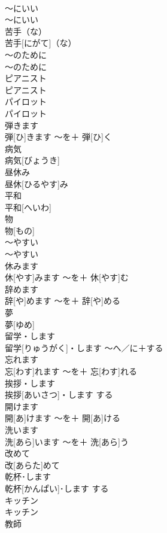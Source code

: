 \documentclass[8pt]{extreport}
\begin{document}
\begin{CJK}{UTF8}{min}
\\	〜にいい	
\\	〜にいい		
\\	苦手（な）	
\\	苦手[にがて]（な）		
\\	〜のために	
\\	〜のために		
\\	ピアニスト	
\\	ピアニスト		
\\	パイロット	
\\	パイロット		
\\	弾きます	
\\	弾[ひ]きます	〜を＋ 弾[ひ]く	
\\	病気	
\\	病気[びょうき]		
\\	昼休み	
\\	昼休[ひるやす]み		
\\	平和	
\\	平和[へいわ]		
\\	物	
\\	物[もの]		
\\	〜やすい	
\\	〜やすい		
\\	休みます	
\\	休[やす]みます	〜を＋ 休[やす]む	
\\	辞めます	
\\	辞[や]めます	〜を＋ 辞[や]める	
\\	夢	
\\	夢[ゆめ]		
\\	留学・します	
\\	留学[りゅうがく]・します	〜へ／に＋する	
\\	忘れます	
\\	忘[わす]れます	〜を＋ 忘[わす]れる	
\\	挨拶・します	
\\	挨拶[あいさつ]・します	する	
\\	開けます	
\\	開[あ]けます	〜を＋ 開[あ]ける	
\\	洗います	
\\	洗[あら]います	〜を＋ 洗[あら]う	
\\	改めて	
\\	改[あらた]めて		
\\	乾杯･します	
\\	乾杯[かんぱい]･します	する	
\\	キッチン	
\\	キッチン		
\\	教師	

\end{CJK}
\end{document}

